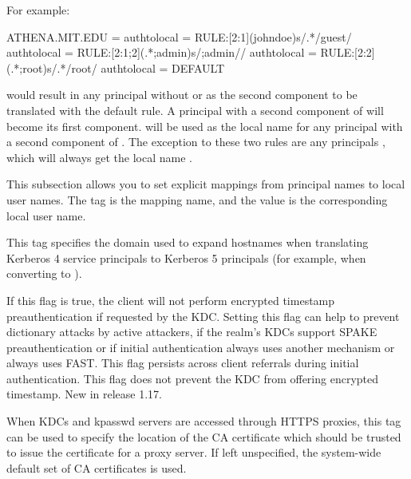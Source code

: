 \documentclass[letterpaper,10pt,english]{sphinxmanual}
\begin{document}
\begin{description}
For example:

%
\begin{sphinxVerbatim}[commandchars=\\\{\}]
[realms]
    ATHENA.MIT.EDU = \PYGZob{}
        auth\PYGZus{}to\PYGZus{}local = RULE:[2:\PYGZdl{}1](johndoe)s/\PYGZca{}.*\PYGZdl{}/guest/
        auth\PYGZus{}to\PYGZus{}local = RULE:[2:\PYGZdl{}1;\PYGZdl{}2](\PYGZca{}.*;admin\PYGZdl{})s/;admin\PYGZdl{}//
        auth\PYGZus{}to\PYGZus{}local = RULE:[2:\PYGZdl{}2](\PYGZca{}.*;root)s/\PYGZca{}.*\PYGZdl{}/root/
        auth\PYGZus{}to\PYGZus{}local = DEFAULT
    \PYGZcb{}
\end{sphinxVerbatim}

would result in any principal without  or  as the
second component to be translated with the default rule.  A
principal with a second component of  will become its
first component.   will be used as the local name for any
principal with a second component of .  The exception to
these two rules are any principals , which will
always get the local name .

\item[{\sphinxstylestrong{auth\_to\_local\_names}}] \leavevmode
This subsection allows you to set explicit mappings from principal
names to local user names.  The tag is the mapping name, and the
value is the corresponding local user name.

\item[{\sphinxstylestrong{default\_domain}}] \leavevmode
This tag specifies the domain used to expand hostnames when
translating Kerberos 4 service principals to Kerberos 5 principals
(for example, when converting  to
).

\item[{\sphinxstylestrong{disable\_encrypted\_timestamp}}] \leavevmode
If this flag is true, the client will not perform encrypted
timestamp preauthentication if requested by the KDC.  Setting this
flag can help to prevent dictionary attacks by active attackers,
if the realm’s KDCs support SPAKE preauthentication or if initial
authentication always uses another mechanism or always uses FAST.
This flag persists across client referrals during initial
authentication.  This flag does not prevent the KDC from offering
encrypted timestamp.  New in release 1.17.

\item[{\sphinxstylestrong{http\_anchors}}] \leavevmode
When KDCs and kpasswd servers are accessed through HTTPS proxies, this tag
can be used to specify the location of the CA certificate which should be
trusted to issue the certificate for a proxy server.  If left unspecified,
the system-wide default set of CA certificates is used.


\end{description}
\end{document}
